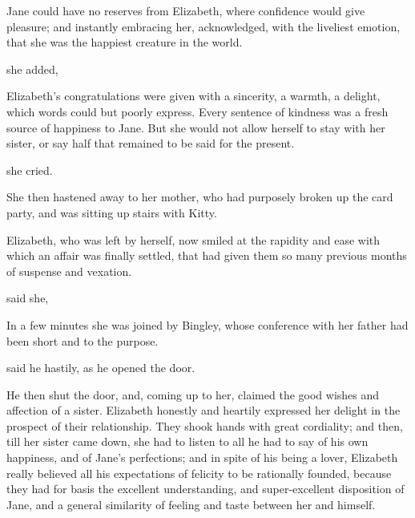 Jane could have no reserves from Elizabeth, where confidence would give pleasure; and instantly embracing her, acknowledged, with the liveliest emotion, that she was the happiest creature in the world.

 she added, 

Elizabeth's congratulations were given with a sincerity, a warmth, a delight, which words could but poorly express. Every sentence of kindness was a fresh source of happiness to Jane. But she would not allow herself to stay with her sister, or say half that remained to be said for the present.

 she cried. 

She then hastened away to her mother, who had purposely broken up the card party, and was sitting up stairs with Kitty.

Elizabeth, who was left by herself, now smiled at the rapidity and ease with which an affair was finally settled, that had given them so many previous months of suspense and vexation.

 said she, 

In a few minutes she was joined by Bingley, whose conference with her father had been short and to the purpose.

 said he hastily, as he opened the door.


He then shut the door, and, coming up to her, claimed the good wishes and affection of a sister. Elizabeth honestly and heartily expressed her delight in the prospect of their relationship. They shook hands with great cordiality; and then, till her sister came down, she had to listen to all he had to say of his own happiness, and of Jane's perfections; and in spite of his being a lover, Elizabeth really believed all his expectations of felicity to be rationally founded, because they had for basis the excellent understanding, and super-excellent disposition of Jane, and a general similarity of feeling and taste between her and himself.

